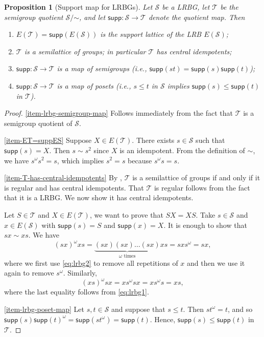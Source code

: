 \documentclass[11pt, oneside, reqno]{amsart}
\newtheorem{prop}[theorem]{Proposition}
\theoremstyle{definition}
\numberwithin{equation}{section}
\def \SS{{\mathcal{S}}}
\def \TT{{\mathcal{T}}}
\def \supp{\mathsf{supp}}
\begin{document}
\begin{prop}[Support map for LRBGs]
    \label{prop:T-cetr-idem}
    Let $\SS$ be a LRBG, let $\TT$ be the semigroup quotient $\SS/\mathord{\sim}$,
    and let $\supp: \SS \longrightarrow  \TT$ denote the quotient map.
    Then
    \begin{enumerate}[start=0]
        \item\label{item-ET=suppES}
            $E(\TT) = \supp(E(\SS))$ is the support lattice of the LRB $E(\SS)$;

        \item\label{item-T-has-central-idempotents}
            $\TT$ is a semilattice of groups; in particular $\TT$ has central idempotents;

        \item\label{item-lrbg-semigroup-map}
            $\supp: \SS \to \TT$ is a map of semigroups
            (i.e., $\supp(st) = \supp(s) \supp(t)$);

        \item\label{item-lrbg-poset-map}
            $\supp: \SS \xrightarrow{} \TT$ is a map of posets
            (i.e., $s \leq t$ in $\SS$ implies $\supp(s) \leq \supp(t)$ in $\TT$).
    \end{enumerate}
\end{prop}
\begin{proof}
    \eqref{item-lrbg-semigroup-map} Follows immediately from the fact that
    $\TT$ is a semigroup quotient of $\SS$.

    \eqref{item-ET=suppES}
    Suppose $X \in E(\TT)$. There exists $s \in \SS$ such that $\supp(s) = X$.
    Then $s \sim s^2$ since $X$ is an idempotent.
    From the definition of $\sim$, we have $s^\omega s^2 = s$, which implies
    $s^2 = s$ because $s^\omega s = s$.

    \eqref{item-T-has-central-idempotents}
    By \citep{cp61semigroupsI}, $\TT$ is a semilattice of groups if and only if
    it is regular and has central idempotents.
    That $\TT$ is regular follows from the fact that it is a LRBG.
    We now show it has central idempotents.

    Let $S \in \TT$ and $X \in E(\TT)$, we want to prove that $SX = XS$.
    Take $s \in \SS$ and $x \in E(\SS)$ with $\supp(s) = S$ and $\supp(x) = X$.
    It is enough to show that $sx \sim xs$.
    We have
    \[
        (sx)^\omega xs = \underbrace{(sx)(sx) \dots (sx)}_{\omega\text{ times}} xs = s x s^\omega = s x,
    \]
    where we first use \cref{eq:lrbg2} to remove all repetitions of $x$ and then we use it again to remove $s^\omega$.
    Similarly,
    \[
        (xs)^\omega sx = x s^\omega s x = x s^\omega s = x s,
    \]
    where the last equality follows from \cref{eq:lrbg1}.

    \eqref{item-lrbg-poset-map}
    Let $s, t \in \SS$ and suppose that $s \leq t$.
    Then $s t^\omega = t$, and so
    $\supp(s) \supp(t)^\omega = \supp(s t^\omega) = \supp(t)$.
    Hence, $\supp(s) \leq \supp(t)$ in $\TT$.
\end{proof}
\end{document}
